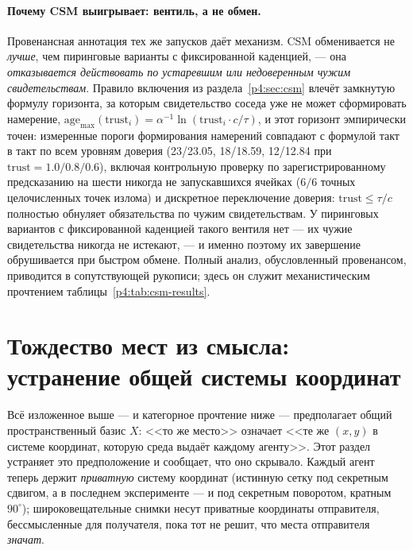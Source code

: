 \documentclass{article}
\begin{document}
\paragraph{Почему CSM выигрывает: вентиль, а не обмен.} Провенансная
аннотация тех же запусков даёт механизм. CSM обменивается не
\emph{лучше}, чем пиринговые варианты с фиксированной каденцией, ---
она \emph{отказывается действовать по устаревшим или недоверенным
чужим свидетельствам}. Правило включения из раздела~\ref{p4:sec:csm}
влечёт замкнутую формулу горизонта, за которым свидетельство соседа
уже не может сформировать намерение,
$\mathrm{age}_{\max}(\mathrm{trust}_i) = \alpha^{-1}
\ln(\mathrm{trust}_i \cdot c/\tau)$, и этот горизонт эмпирически
точен: измеренные пороги формирования намерений совпадают с формулой
такт в такт по всем уровням доверия (23/23.05, 18/18.59, 12/12.84 при
$\mathrm{trust}=1.0/0.8/0.6$), включая контрольную проверку по
зарегистрированному предсказанию на шести никогда не запускавшихся
ячейках ($6/6$ точных целочисленных точек излома) и дискретное
переключение доверия: $\mathrm{trust}\le\tau/c$ полностью обнуляет
обязательства по чужим свидетельствам. У пиринговых вариантов с
фиксированной каденцией такого вентиля нет --- их чужие свидетельства
никогда не истекают, --- и именно поэтому их завершение обрушивается
при быстром обмене. Полный анализ, обусловленный провенансом,
приводится в сопутствующей рукописи; здесь он служит механистическим
прочтением таблицы~\ref{p4:tab:csm-results}.

\section{Тождество мест из смысла: устранение общей системы координат}
\label{p4:sec:semantic-identity}

Всё изложенное выше --- и категорное прочтение ниже --- предполагает
общий пространственный базис $X$: <<то же место>> означает <<те же
$(x,y)$ в системе координат, которую среда выдаёт каждому агенту>>.
Этот раздел устраняет это предположение и сообщает, что оно скрывало.
Каждый агент теперь держит \emph{приватную} систему координат
(истинную сетку под секретным сдвигом, а в последнем эксперименте ---
и под секретным поворотом, кратным $90^\circ$); широковещательные
снимки несут приватные координаты отправителя, бессмысленные для
получателя, пока тот не решит, что места отправителя \emph{значат}.
\end{document}
